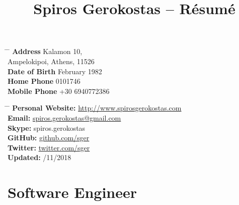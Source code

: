 \documentclass[10pt]{article}
\begin{document}
\title{Spiros Gerokostas -- Résumé} 


\parbox{0.5\textwidth}{ %
\begin{tabbing} %
\hspace{3cm} \= \hspace{4cm} \= \kill %
{\bf Address} \> Kalamon 10,\\ %
\> Ampelokipoi, Athens, 11526 \\ %
{\bf Date of Birth}  February 1982 \\ %
{\bf Home Phone}  0101746 \\ %
{\bf Mobile Phone} \>+30 6940772386 \\ %
\end{tabbing}}
\hfill %
\parbox{0.5\textwidth}{ %
\begin{tabbing} %
\hspace{3cm} \= \hspace{4cm} \= \kill %
{\bf Personal Website:} \>\href{http://spirosgerokostas.com}{http://www.spirosgerokostas.com} \\ %
{\bf Email:} \> \href{mailto:spiros.gerokostas@gmail.com}{spiros.gerokostas@gmail.com} \\ %
{\bf Skype:} \> spiros.gerokostas \\ %
{\bf GitHub:} \>\href{http://github.com/sger}{github.com/sger} \\ %
{\bf Twitter:} \>\href{http://twitter.com/sger}{twitter.com/sger} \\ %
{\bf Updated:} /11/2018 \\ %
\end{tabbing}}


\section{Software Engineer}

\end{document}
